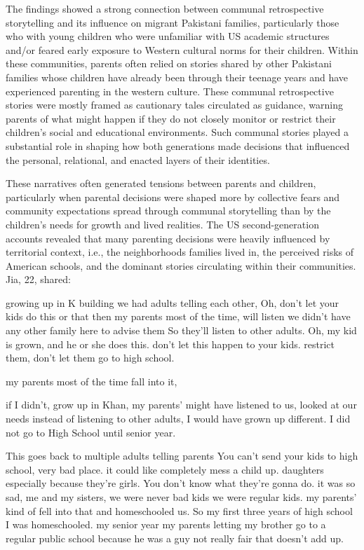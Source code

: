 The findings showed a strong connection between communal retrospective storytelling and its influence on migrant Pakistani families, particularly those who with young children who were unfamiliar with US academic structures and/or feared early exposure to Western cultural norms for their children. Within these communities, parents often relied on stories shared by other Pakistani families whose children have already been through their teenage years and have experienced parenting in the western culture. These communal retrospective stories were mostly framed as cautionary tales circulated as guidance, warning parents of what might happen if they do not closely monitor or restrict their children’s social and educational environments. Such communal stories played a substantial role in shaping how both generations made decisions that influenced the personal, relational, and enacted layers of their identities.

These narratives often generated tensions between parents and children, particularly when parental decisions were shaped more by collective fears and community expectations spread through communal storytelling than by the children’s needs for growth and lived realities. The US second-generation accounts revealed that many parenting decisions were heavily influenced by territorial context, i.e., the neighborhoods families lived in, the perceived risks of American schools, and the dominant stories circulating within their communities. Jia, 22, shared:

\begin{FoundPoem}
  growing up in K building
	we had adults telling each other, 
	Oh, don't let your kids do this or that
	 then my parents most of the time,
	 will listen 
	we didn't have any other family here to advise them
	 So they'll listen
	 to other adults. 
	Oh, my kid is grown, and he or she does this.
	don't let this happen to your kids.
	                                        restrict them, 
	don't let them go to high school.
	 
	my parents most of the time       fall into it,
	 
	if I didn't, grow up in Khan, 
	my parents' might have listened to us,
	 looked at our needs 
	instead of listening to other adults, 
             I would have grown up different.
	I did not go to High School until senior year.

 	This goes back to multiple adults telling parents 
            You can't send your kids to high school, 
             very bad place. 
             it could like completely mess a child up. 
               daughters 
            especially because they're girls.
	You don't know what they're gonna do. 
	 it was so sad,  
	 me and my sisters,
	 we were never bad kids
	 we were regular kids. 
	my parents' kind of fell into that 
	and homeschooled us.
	 So my first three years of high school I was homeschooled.
	my senior year my parents 
letting my brother go to a regular public school
	 because he was a guy 
not really fair that doesn't add up.
\end{FoundPoem}

